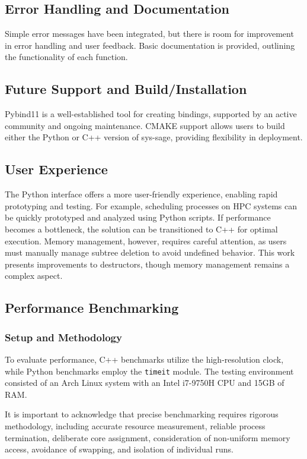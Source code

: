 \subsection{Error Handling and Documentation}

Simple error messages have been integrated, but there is room for improvement in error handling and user feedback. Basic documentation is provided, outlining the functionality of each function.

\subsection{Future Support and Build/Installation}

Pybind11 is a well-established tool for creating bindings, supported by an active community and ongoing maintenance. CMAKE support allows users to build either the Python or C++ version of sys-sage, providing flexibility in deployment.

\subsection{User Experience}

The Python interface offers a more user-friendly experience, enabling rapid prototyping and testing. For example, scheduling processes on HPC systems can be quickly prototyped and analyzed using Python scripts. If performance becomes a bottleneck, the solution can be transitioned to C++ for optimal execution. Memory management, however, requires careful attention, as users must manually manage subtree deletion to avoid undefined behavior. This work presents improvements to destructors, though memory management remains a complex aspect.

\subsection{Performance Benchmarking}

\subsubsection{Setup and Methodology}

To evaluate performance, C++ benchmarks utilize the high-resolution clock, while Python benchmarks employ the \texttt{timeit} module. The testing environment consisted of an Arch Linux system with an Intel i7-9750H CPU and 15GB of RAM.

It is important to acknowledge that precise benchmarking requires rigorous methodology, including accurate resource measurement, reliable process termination, deliberate core assignment, consideration of non-uniform memory access, avoidance of swapping, and isolation of individual runs. \cite{beyer2019reliable}

